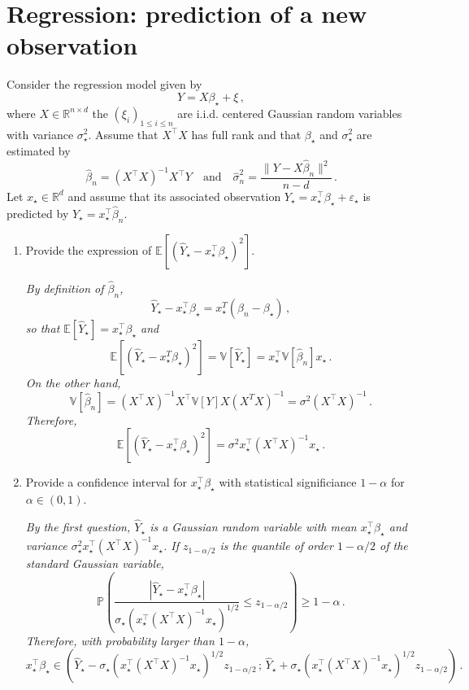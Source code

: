 \documentclass[a4paper,10pt,fleqn]{article}
\newcommand{\eqsp}{\,}
\newcommand{\rset}{\ensuremath{\mathbb{R}}}
\newcommand{\1}{\ensuremath{\mathbbm{1}}}
\newcommand{\bE}{\mathbb{E}}
\begin{document}
\section*{Regression: prediction of a new observation}
Consider the regression model given by
$$
Y = X\beta_{\star}+ \xi\eqsp,
$$
where $X\in\rset^{n\times d}$ the $(\xi_{i})_{1\leqslant i \leqslant n}$ are i.i.d. centered Gaussian random variables with variance $\sigma_{\star}^2$. Assume that $X^\top X$ has full rank and that $\beta_\star$ and $\sigma_{\star}^2$ are estimated by 
$$
\widehat \beta_n = (X^\top X)^{-1}X^\top Y\quad\mathrm{and}\quad \widehat \sigma^2_n =\frac{\|Y - X\widehat \beta_n \|^2}{n-d}\eqsp.
$$
Let $x_\star \in\rset^d$ and assume that its associated observation $Y_\star = x_\star^\top\beta_\star + \varepsilon_\star$ is predicted by $\widehat Y_\star = x_\star^\top\widehat \beta_n$.
\begin{enumerate}
\item  Provide the expression of $\bE[(\widehat Y_\star - x_\star^\top\beta_\star)^2]$.

\vspace{.2cm}

{\em
By definition of $\widehat \beta_n $,
$$
\widehat Y_\star - x_\star^\top\beta_\star = x_\star^T (\widehat\beta_n - \beta_\star)\,,
$$
so that $\bE[\widehat Y_\star] =  x_\star^\top\beta_\star$ and
$$
\bE[(\widehat Y_\star - x_\star^T\beta_\star)^2] = \mathbb{V}[\widehat Y_\star] = x_\star^\top \mathbb{V}[\widehat\beta_n]x_\star\,.
$$
On the other hand,
$$
\mathbb{V}[\widehat\beta_n] = (X^\top X)^{-1}X^\top \mathbb{V}[Y] X(X^TX)^{-1} = \sigma^2(X^\top X)^{-1}\,.
$$
Therefore,
$$
\bE[(\widehat Y_\star - x_\star^\top\beta_\star)^2] = \sigma^2x_\star^\top (X^\top X)^{-1}x_\star\,.
$$
}

\item  Provide a confidence interval for $x_\star^\top\beta_\star$ with statistical significiance $1-\alpha$ for $\alpha\in(0,1)$.

\vspace{.2cm}

{\em
By the first question, $\widehat Y_\star$ is a Gaussian random variable with mean $x_\star^\top\beta_\star$ and variance $\sigma_\star^2x_\star^\top(X^\top X)^{-1}x_\star$. If $z_{1-\alpha/2}$ is the quantile of order $1-\alpha/2$ of the standard Gaussian variable,
$$
\mathbb{P}\left(\frac{\left|\widehat Y_\star-x_\star^\top\beta_\star\right|}{\sigma_\star(x_\star^\top(X^\top X)^{-1}x_\star)^{1/2}}\leqslant z_{1-\alpha/2}\right)\geqslant 1-\alpha\,.
$$
Therefore, with probability larger than $1-\alpha$,
$$
x_\star^\top\beta_\star \in \left(\widehat Y_\star - \sigma_\star(x_\star^\top (X^\top X)^{-1}x_\star)^{1/2}z_{1-\alpha/2}\,;\, \widehat Y_\star + \sigma_\star(x_\star^\top(X^\top X)^{-1}x_\star)^{1/2}z_{1-\alpha/2}\right)\,.
$$
}
\end{enumerate}
\end{document}
